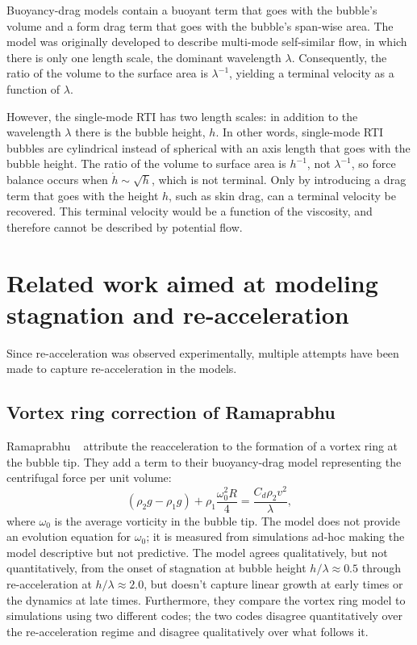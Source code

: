 Buoyancy-drag models contain a buoyant term that goes with the bubble's volume and a form drag term that goes with the bubble's span-wise area.
The model was originally developed to describe multi-mode self-similar flow, in which there is only one length scale, the dominant wavelength $\lambda$.
Consequently, the ratio of the volume to the surface area is $\lambda^{-1}$, yielding a terminal velocity as a function of $\lambda$.

However, the single-mode RTI has two length scales: in addition to the wavelength $\lambda$ there is the bubble height, $h$.
In other words, single-mode RTI bubbles are cylindrical instead of spherical with an axis length that goes with the bubble height.
The ratio of the volume to surface area is $h^{-1}$, not $\lambda^{-1}$, so force balance occurs when $\dot{h} \sim \sqrt{h}$, which is not terminal.
Only by introducing a drag term that goes with the height $h$, such as skin drag, can a terminal velocity be recovered.
This terminal velocity would be a function of the viscosity, and therefore cannot be described by potential flow.

\section{Related work aimed at modeling stagnation and re-acceleration}
Since re-acceleration was observed experimentally, multiple attempts have been made to capture re-acceleration in the models.

\subsection{Vortex ring correction of Ramaprabhu}

Ramaprabhu \etal ~\cite{Ramaprabhu2012} attribute the reacceleration to the formation of a vortex ring at the bubble tip.
They add a term to their buoyancy-drag model representing the centrifugal force per unit volume:
\begin{equation}
\left(\rho_2 g - \rho_1 g\right) + \rho_1 \frac{\omega_0^2 R}{ 4} = \frac{C_d \rho_2 v^2}{\lambda},
\end{equation}
where $\omega_0$ is the average vorticity in the bubble tip.
The model does not provide an evolution equation for $\omega_0$; it is measured from simulations ad-hoc making the model descriptive but not predictive.
The model agrees qualitatively, but not quantitatively, from the onset of stagnation at bubble height $h / \lambda \approx 0.5$ through re-acceleration at $h/\lambda \approx 2.0$, but doesn't capture linear growth at early times or the dynamics at late times.
Furthermore, they compare the vortex ring model to simulations using two different codes; the two codes disagree quantitatively over the re-acceleration regime and disagree qualitatively over what follows it.

